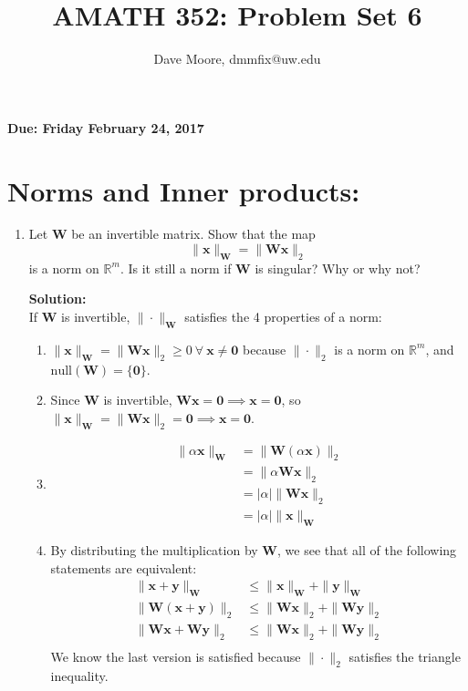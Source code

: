 \documentclass[]{article}
\title{AMATH 352: Problem Set 6}
\author{Dave Moore, dmmfix@uw.edu}
\newcommand{\R}{\mathbb{R}}				%
\newcommand{\x}{\bm{x}}					%
\newcommand{\y}{\bm{y}}					%
\newcommand{\vnull}{\mathrm{null}}		%
\newcommand{\solution}{\vskip 0.5cm \textbf{\large Solution:} \\}
\begin{document}
\maketitle
    {\Large \textbf{Due: Friday February 24, 2017}} \\

    \section*{Norms and Inner products:}
    \begin{enumerate}[resume]
	\item Let $\bm{W}$ be an invertible matrix. Show that the map
	  \[
	  \|\x\|_{\bm{W}}=\|\bm{Wx}\|_2
	  \]
	  is a norm on $\R^m$. Is it still a norm if $\bm{W}$ is singular? Why or why not?

	  \solution If $\bm{W}$ is invertible, $\|\cdot\|_{\bm{W}}$
      satisfies the 4 properties of a norm:
      \begin{enumerate}
      \item $\|\x\|_{\bm{W}} = \|\bm{Wx}\|_2 \geq 0~\forall~ \x \neq
        \bm{0}$ because $\|\cdot\|_2$ is a norm on $\R^m$, and
        $\vnull(\bm{W}) = \{\bm{0}\}$.
        
      \item Since $\bm{W}$ is invertible, $\bm{Wx} = \bm{0}
        \implies \x = \bm{0}$, so $\|\x\|_{\bm{W}}=\|\bm{Wx}\|_2 =
        \bm{0} \implies \bm{x} = \bm{0}$.
        
      \item
        \[\begin{split}
          \|\alpha \x\|_{\bm{W}} & = \|\bm{W} (\alpha \x)\|_2 \\
          & = \|\alpha \bm{Wx}\|_2 \\
          & = |\alpha| \|\bm{Wx}\|_2 \\
          & = |\alpha| \|\x\|_{\bm{W}}
        \end{split}\]

      \item By distributing the multiplication by $\bm{W}$, we see
        that all of the following statements are equivalent:
        \[\begin{split}
          \|\x + \y\|_{\bm{W}} & \leq \|\x\|_{\bm{W}} + \|\y\|_{\bm{W}} \\
          \|\bm{W}(\x + \y)\|_2 & \leq \|\bm{Wx}\|_2 + \|\bm{Wy}\|_2 \\
          \|\bm{Wx} + \bm{Wy}\|_2 & \leq \|\bm{Wx}\|_2 + \|\bm{Wy}\|_2 \\
        \end{split}\]
        We know the last version is satisfied because $\|\cdot\|_2$
        satisfies the triangle inequality.
      \end{enumerate}


\end{enumerate}
\end{document}
